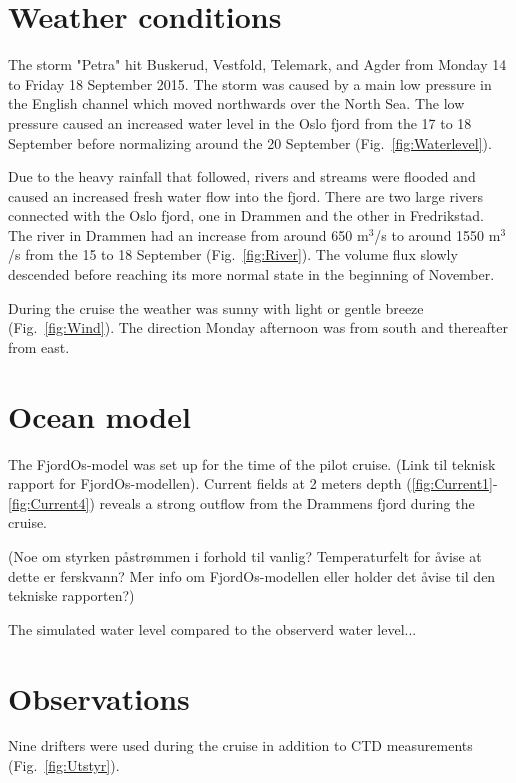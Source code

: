 \documentclass[12pt,a4paper,english]{article}
\begin{document}
\section{Weather conditions}

The storm "Petra" hit Buskerud, Vestfold, Telemark, and Agder from Monday 14 to Friday 18 September 2015. The storm was caused by a main low pressure in the English channel which moved northwards over the North Sea. The low pressure caused an increased water level in the Oslo fjord from the 17 to 18 September before normalizing around the 20 September (Fig.~\ref{fig:Waterlevel}).

Due to the heavy rainfall that followed, rivers and streams were flooded and caused an increased fresh water flow into the fjord. There are two large rivers connected with the Oslo fjord, one in Drammen and the other in Fredrikstad. The river in Drammen had an increase from around 650 m$^3$/s to around 1550 m$^3$/s from the 15 to 18 September (Fig.~\ref{fig:River}). The volume flux slowly descended before reaching its more normal state in the beginning of November. 

During the cruise the weather was sunny with light or gentle breeze (Fig.~\ref{fig:Wind}). The direction Monday afternoon was from south  and thereafter from east. 

\section{Ocean model}
The FjordOs-model was set up for the time of the pilot cruise. (Link til teknisk rapport for FjordOs-modellen). Current fields at 2 meters depth (\ref{fig:Current1}-\ref{fig:Current4}) reveals a strong outflow from the Drammens fjord during the cruise. 

(Noe om styrken p\aa str\o mmen i forhold til vanlig? Temperaturfelt for \aa vise at dette er ferskvann? Mer info om FjordOs-modellen eller holder det \aa vise til den tekniske rapporten?)

The simulated water level compared to the observerd water level...


\section{Observations}
Nine drifters were used during the cruise in addition to CTD measurements (Fig.~\ref{fig:Utstyr}). %
\end{document}
